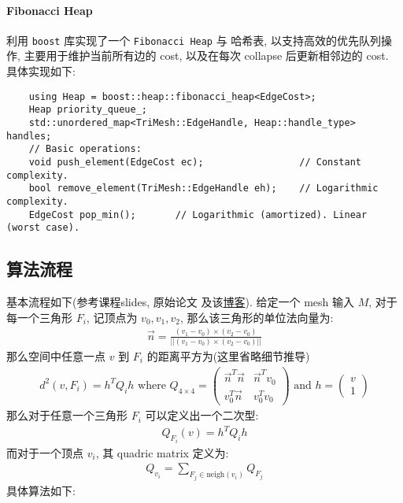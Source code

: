 \documentclass[11pt]{article}
\newcommand\1{\mathds{1}}
\begin{document}
\paragraph{Fibonacci Heap} 利用 \texttt{boost} 库实现了一个 \texttt{Fibonacci Heap} 与 哈希表, 
以支持高效的优先队列操作, 主要用于维护当前所有边的 cost, 以及在每次 collapse 后更新相邻边的 cost. 具体实现如下:
\begin{verbatim}
    using Heap = boost::heap::fibonacci_heap<EdgeCost>;
    Heap priority_queue_;
    std::unordered_map<TriMesh::EdgeHandle, Heap::handle_type> handles;
    // Basic operations:
    void push_element(EdgeCost ec);                 // Constant complexity.
    bool remove_element(TriMesh::EdgeHandle eh);    // Logarithmic complexity.
    EdgeCost pop_min();       // Logarithmic (amortized). Linear (worst case).
\end{verbatim}

\subsection{算法流程}   
基本流程如下(参考课程slides, 原始论文\cite{QEM} 及该\href{https://blog.libreliu.info/qem-mesh-simplification/}{博客}).
给定一个 mesh 输入 $M$, 对于每一个三角形 $F_i$, 记顶点为 $v_0, v_1, v_2$, 
那么该三角形的单位法向量为:
\begin{align*}
    \vec{n} = \frac{(v_1 - v_0) \times (v_2 - v_0)}{||(v_1 - v_0) \times (v_2 - v_0)||}
\end{align*}
那么空间中任意一点 $v$ 到 $F_i$ 的距离平方为(这里省略细节推导)
\begin{align*}
    d^2(v, F_i) = h^T Q_i h \text{ where } Q_{4\times 4} = \begin{pmatrix}
        \vec{n}^T \vec{n} & \vec{n}^T v_0 \\
        v_0^T \vec{n} & v_0^T v_0
    \end{pmatrix} \text{ and } h = \begin{pmatrix}
        v \\
        1
    \end{pmatrix}
\end{align*}
那么对于任意一个三角形 $F_i$ 可以定义出一个二次型:
\begin{align*}
    Q_{F_i}(v) = h^T Q_i h 
\end{align*}
而对于一个顶点 $v_i$, 其 quadric matrix 定义为:
\begin{align*}
    Q_{v_i} = \sum_{F_j \in \text{neigh}(v_i)} Q_{F_j}
\end{align*}
具体算法如下: 
\end{document}

